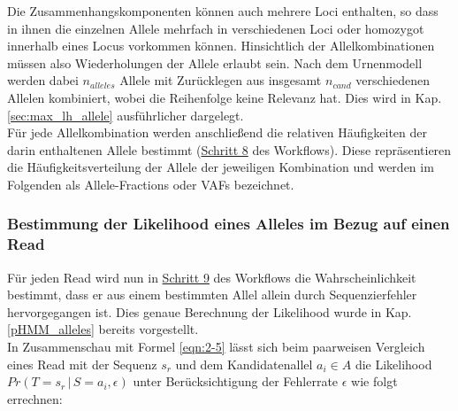 Die Zusammenhangskomponenten können auch mehrere Loci enthalten, so dass in ihnen die einzelnen Allele mehrfach in verschiedenen Loci oder homozygot innerhalb eines Locus vorkommen können. Hinsichtlich der Allelkombinationen müssen also Wiederholungen der Allele erlaubt sein. Nach dem Urnenmodell werden dabei $n_{alleles}$ Allele mit Zurücklegen aus insgesamt $ n_{cand} $ verschiedenen Allelen kombiniert, wobei die Reihenfolge keine Relevanz hat. Dies wird in Kap. \ref{sec:max_lh_allele} ausführlicher dargelegt. \\

Für jede Allelkombination werden anschließend die relativen Häufigkeiten der darin enthaltenen Allele bestimmt (\hyperref[step8]{Schritt 8\label{step8txt}} des Workflows). Diese repräsentieren die Häufigkeitsverteilung der Allele der jeweiligen Kombination und werden im Folgenden als Allele-Fractions oder VAFs bezeichnet.\\

\subsubsection{Bestimmung der Likelihood eines Alleles im Bezug auf einen Read} \label{sol_al_read}

Für jeden Read wird nun in \hyperref[step9]{Schritt 9} des Workflows die Wahrscheinlichkeit bestimmt, dass er aus einem bestimmten Allel allein durch Sequenzierfehler hervorgegangen ist. Dies genaue Berechnung der Likelihood wurde in Kap. \ref{pHMM_alleles} bereits vorgestellt. \\

In Zusammenschau mit Formel \eqref{eqn:2-5} lässt sich beim paarweisen Vergleich eines Read mit der Sequenz $s_{r}$ und dem Kandidatenallel $a_{i} \in A $ die Likelihood $ Pr(T=s_{r} \, | \, S=a_{i}, \epsilon) $ unter Berücksichtigung der Fehlerrate $\epsilon$ wie folgt errechnen:
\vspace{-0.5cm}
\begin{center}
\end{center}

